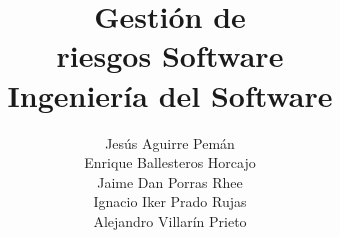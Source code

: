 \documentclass[spanish,a4paper,12pt]{report}	%
\begin{document}
\title{\textbf{\huge{Gestión de \\
	riesgos Software}} \\ \vspace{0.3cm}
	\Large{Ingeniería del Software}}
\author{ Jesús Aguirre Pemán \\
	 Enrique Ballesteros Horcajo \\
	 Jaime Dan Porras Rhee \\
	 Ignacio Iker Prado Rujas \\
	 Alejandro Villarín Prieto }
\date{\Today}
\maketitle



\tableofcontents 							%


\newpage
\mbox{}
\thispagestyle{empty}						%
\newpage
\setcounter{section}{0}
\end{document}
